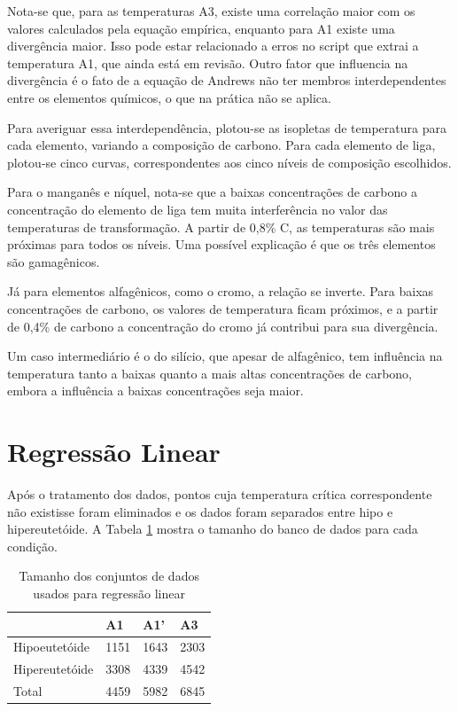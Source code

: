 \documentclass[brazil,tf,epusp]{usp}  %
\begin{document}
Nota-se que, para as temperaturas A3, existe uma correlação maior com os valores calculados pela equação empírica, enquanto para A1 existe uma divergência maior. Isso pode estar relacionado a erros no script que extrai a temperatura A1, que ainda está em revisão. Outro fator que influencia na divergência é o fato de a equação de Andrews não ter membros interdependentes entre os elementos químicos, o que na prática não se aplica.

Para averiguar essa interdependência, plotou-se as isopletas de temperatura para cada elemento, variando a composição de carbono. Para cada elemento de liga, plotou-se cinco curvas, correspondentes aos cinco níveis de composição escolhidos.

Para o manganês e níquel, nota-se que a baixas concentrações de carbono a concentração do elemento de liga tem muita interferência no valor das temperaturas de transformação. A partir de 0,8\% C, as temperaturas são mais próximas para todos os níveis. Uma possível explicação é que os três elementos são gamagênicos.

Já para elementos alfagênicos, como o cromo, a relação se inverte. Para baixas concentrações de carbono, os valores de temperatura ficam próximos, e a partir de 0,4\% de carbono a concentração do cromo já contribui para sua divergência.

Um caso intermediário é o do silício, que apesar de alfagênico, tem influência na temperatura tanto a baixas quanto a mais altas concentrações de carbono, embora a influência a baixas concentrações seja maior.

\section{Regressão Linear}

Após o tratamento dos dados, pontos cuja temperatura crítica correspondente não existisse foram eliminados e os
dados foram separados entre hipo e hipereutetóide. A Tabela \ref{tab:conj_dados} mostra o tamanho do banco de dados para cada condição.

\begin{table}
  \caption{Tamanho dos conjuntos de dados usados para regressão linear}

  \begin{tabular}{llll}
  \hline
                 & A1   & A1'  & A3   \\
  \hline
  Hipoeutetóide  & 1151 & 1643 & 2303 \\
  Hipereutetóide & 3308 & 4339 & 4542 \\
  Total          & 4459 & 5982 & 6845 \\
  \hline
  \end{tabular}

  \label{tab:conj_dados}
\end{table}
\end{document}

